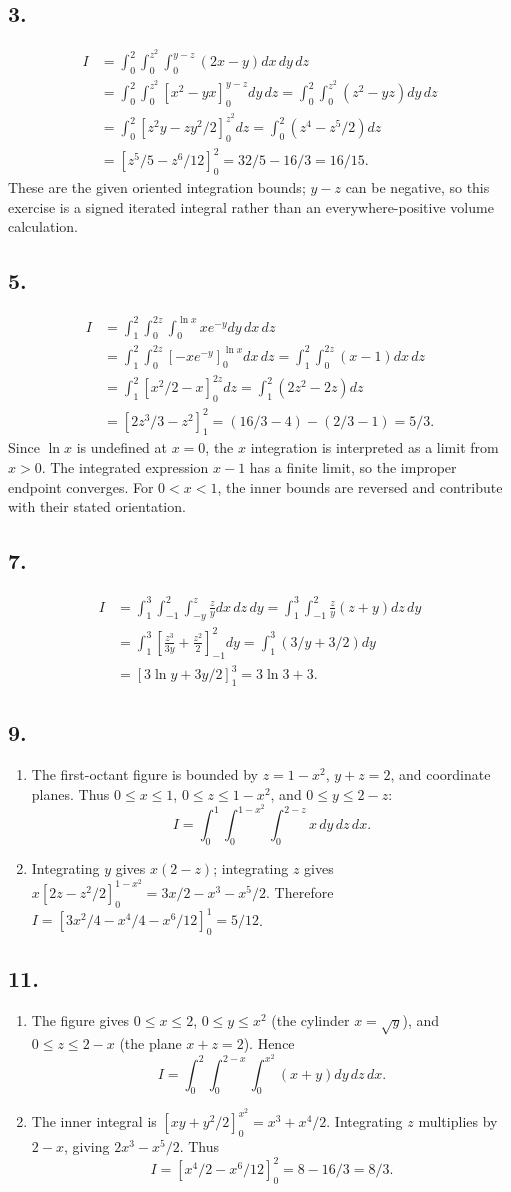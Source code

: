 \documentclass[11pt]{article}
\newcommand{\ex}[1]{\subsection*{#1.}}
\newcommand{\ans}[1]{\boxed{#1}}
\begin{document}
\ex{3}
\begin{align*}
I&=\int_0^2\int_0^{z^2}\int_0^{y-z}(2x-y)dx\,dy\,dz\\
&=\int_0^2\int_0^{z^2}[x^2-yx]_0^{y-z}dy\,dz
=\int_0^2\int_0^{z^2}(z^2-yz)dy\,dz\\
&=\int_0^2[z^2y-zy^2/2]_0^{z^2}dz
=\int_0^2(z^4-z^5/2)dz\\
&=[z^5/5-z^6/12]_0^2=32/5-16/3=\ans{16/15}.
\end{align*}
These are the given oriented integration bounds; $y-z$ can be negative, so this exercise is a signed iterated integral rather than an everywhere-positive volume calculation.
\ex{5}
\begin{align*}
I&=\int_1^2\int_0^{2z}\int_0^{\ln x}xe^{-y}dy\,dx\,dz\\
&=\int_1^2\int_0^{2z}[-xe^{-y}]_0^{\ln x}dx\,dz
=\int_1^2\int_0^{2z}(x-1)dx\,dz\\
&=\int_1^2[x^2/2-x]_0^{2z}dz=\int_1^2(2z^2-2z)dz\\
&=[2z^3/3-z^2]_1^2=(16/3-4)-(2/3-1)=\ans{5/3}.
\end{align*}
Since $\ln x$ is undefined at $x=0$, the $x$ integration is interpreted as a limit from $x>0$. The integrated expression $x-1$ has a finite limit, so the improper endpoint converges. For $0<x<1$, the inner bounds are reversed and contribute with their stated orientation.
\ex{7}
\begin{align*}
I&=\int_1^3\int_{-1}^2\int_{-y}^z\frac zy dx\,dz\,dy
=\int_1^3\int_{-1}^2\frac zy(z+y)dz\,dy\\
&=\int_1^3\left[\frac{z^3}{3y}+\frac{z^2}{2}\right]_{-1}^2dy
=\int_1^3(3/y+3/2)dy\\
&=[3\ln y+3y/2]_1^3=\ans{3\ln3+3}.
\end{align*}
\ex{9}
\begin{enumerate}[label=(\alph*)]
\item The first-octant figure is bounded by $z=1-x^2$, $y+z=2$, and coordinate planes. Thus $0\le x\le1$, $0\le z\le1-x^2$, and $0\le y\le2-z$:
\[\ans{I=\int_0^1\int_0^{1-x^2}\int_0^{2-z}x\,dy\,dz\,dx}.\]
\item Integrating $y$ gives $x(2-z)$; integrating $z$ gives $x[2z-z^2/2]_0^{1-x^2}=3x/2-x^3-x^5/2$. Therefore $I=[3x^2/4-x^4/4-x^6/12]_0^1=\ans{5/12}$.
\end{enumerate}
\ex{11}
\begin{enumerate}[label=(\alph*)]
\item The figure gives $0\le x\le2$, $0\le y\le x^2$ (the cylinder $x=\sqrt y$), and $0\le z\le2-x$ (the plane $x+z=2$). Hence
\[\ans{I=\int_0^2\int_0^{2-x}\int_0^{x^2}(x+y)dy\,dz\,dx}.\]
\item The inner integral is $[xy+y^2/2]_0^{x^2}=x^3+x^4/2$. Integrating $z$ multiplies by $2-x$, giving $2x^3-x^5/2$. Thus
\[I=[x^4/2-x^6/12]_0^2=8-16/3=\ans{8/3}.\]
\end{enumerate}
\end{document}
